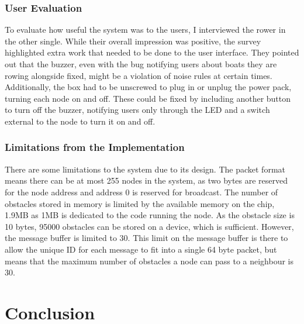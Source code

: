 \documentclass[12pt,a4paper]{report}
\newcommand{\newchapter}[2]{
    \setcounter{chapter}{#1}
    \setcounter{section}{0}
    \chapter*{#2}
    \addcontentsline{toc}{chapter}{#1 #2}
}
\begin{document}
\subsection{User Evaluation}
To evaluate how useful the system was to the users, I interviewed the rower in the other single. While their overall impression was positive, the survey highlighted extra work that needed to be done to the user interface. They pointed out that the buzzer, even with the bug notifying users about boats they are rowing alongside fixed, might be a violation of noise rules at certain times. Additionally, the box had to be unscrewed to plug in or unplug the power pack, turning each node on and off. These could be fixed by including another button to turn off the buzzer, notifying users only through the LED and a switch external to the node to turn it on and off. \\

\subsection{Limitations from the Implementation}
There are some limitations to the system due to its design. The packet format means there can be at most 255 nodes in the system, as two bytes are reserved for the node address and address 0 is reserved for broadcast. The number of obstacles stored in memory is limited by the available memory on the chip, 1.9MB as 1MB is dedicated to the code running the node. As the obstacle size is 10 bytes, 95000 obstacles can be stored on a device, which is sufficient. However, the message buffer is limited to 30. This limit on the message buffer is there to allow the unique ID for each message to fit into a single 64 byte packet, but means that the maximum number of obstacles a node can pass to a neighbour is 30.

\newchapter{5}{Conclusion}
\setcounter{figure}{0}
\end{document}
